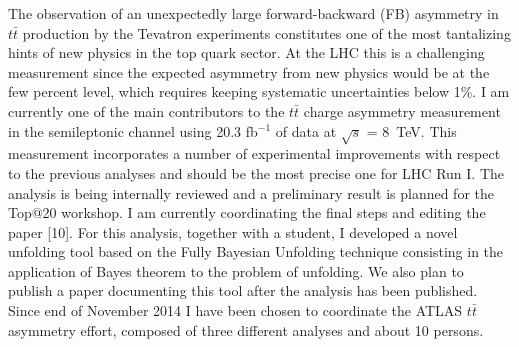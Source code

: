 \documentclass[12pt]{article}
\begin{document}
\begin{itemize}[leftmargin=1.3cm]
The observation of an unexpectedly large forward-backward (FB) asymmetry in $t\bar{t}$ production by the Tevatron experiments constitutes one 
of the most tantalizing hints of new physics in the top quark sector. 
At the LHC this is a challenging measurement since the expected asymmetry from new physics would be at the few percent level, which requires keeping 
systematic uncertainties below 1\%. 
I am currently one of the main contributors to the $t\bar{t}$ charge asymmetry measurement in the semileptonic channel 
using 20.3 fb$^{-1}$ of data at $\sqrt{s}$ = 8~TeV. This measurement incorporates a number of experimental improvements with respect to the previous 
analyses and should be the most precise one for LHC Run I.  The analysis is being internally reviewed and a preliminary result is planned for the Top@20 workshop.
I am currently coordinating the final steps and editing the paper [10]. 
For this analysis, together with a student, I developed a novel unfolding tool based on the Fully Bayesian Unfolding technique consisting in the application of 
Bayes theorem to the problem of unfolding. We also plan to publish a paper documenting this tool after the analysis has been published.
Since end of November 2014 I have been chosen to coordinate the ATLAS $t\bar{t}$ asymmetry effort, composed of three 
different analyses and about 10 persons. 



\end{itemize}
\end{document}
